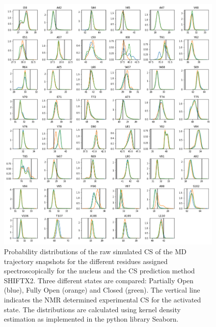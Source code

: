 \documentclass[%
 aip,
 amsmath,amssymb,
 preprint,%
]{revtex4-1}
\newcommand{\cb}{\ce{C_\beta} }
\begin{document}
\begin{figure}[tbp]
	\includegraphics[width=\textwidth]{figures_SI/hist_shiftx2_CB.png}
	 \caption{\scriptsize
 Probability distributions of the raw simulated CS of the MD trajectory snapshots for the different residues assigned spectroscopically for the \cb nucleus and the CS prediction method SHIFTX2. Three different states are compared: Partially Open (blue), Fully Open (orange) and Closed (green). The vertical line indicates the NMR determined experimental CS for the activated state. The distributions are calculated using kernel density estimation as implemented in the python library Seaborn. 
}
\label{SI_hist2}
\end{figure}
\end{document}
